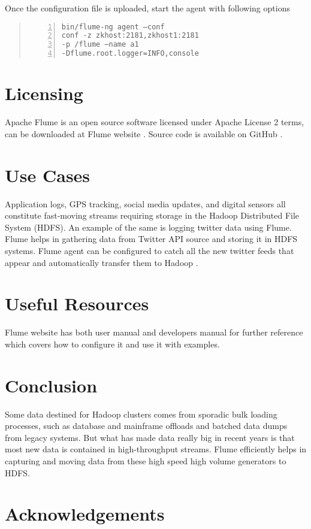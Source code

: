 \documentclass[9pt,twocolumn,twoside]{styles/osajnl}
\newcommand{\TODO}[2][]{\todo[color=red!10,inline,#1]{#2}}
\begin{document}
Once the configuration file is uploaded, start the agent with following options \cite{user-manual}
\begin{quote}
\begin{Verbatim}[numbers=left]
bin/flume-ng agent –conf 
conf -z zkhost:2181,zkhost1:2181 
-p /flume –name a1 
-Dflume.root.logger=INFO,console
\end{Verbatim}
\end{quote}

\section{Licensing}
Apache Flume is an open source software licensed under Apache License 2 terms, can be downloaded at Flume website \cite{down}. Source code is available on GitHub \cite{git}.

\section{Use Cases}
Application logs, GPS tracking, social media updates, and digital sensors all constitute fast-moving streams requiring storage in the Hadoop Distributed File System (HDFS). An example of the same is logging twitter data using Flume. Flume helps in gathering data from Twitter API source and storing it in HDFS systems. Flume agent can be configured to catch all the new twitter feeds that appear and automatically transfer them to Hadoop \cite{flume-application}.

\section{Useful Resources}
Flume website has both user manual \cite{user-manual} and developers manual \cite{dev-manual} for further reference which covers how to configure it and use it with examples.
\section{Conclusion}
Some data destined for Hadoop clusters comes from sporadic bulk loading processes, such as database and mainframe offloads and batched data dumps from legacy systems. But what has made data really big in recent years is that most new data is contained in high-throughput streams. Flume efficiently helps in capturing and moving data from these high speed high volume generators to HDFS.

\TODO{well written}

\section*{Acknowledgements}
\end{document}
